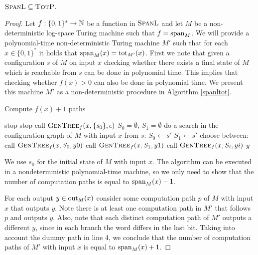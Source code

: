 \begin{theo}
	$\spanl \subseteq \totp$.
\end{theo}
\begin{proof}
	Let $f:\{0,1\}^*\to\N$ be a function in $\spanl$ and let $M$ be a non-deterministic log-space Turing machine such that $f = \sp_M$. We will provide a polynomial-time non-deterministic Turing machine $M'$ such that for each $x\in\{0,1\}^*$ it holds that $\sp_M(x) = \tot_{M'}(x)$. First we note that given a configuration $s$ of $M$ on input $x$ checking whether there exists a final state of $M$ which is reachable from $s$ can be done in polynomial time. This implies that checking whether $f(x) > 0$ can also be done in polynomial time. We present this machine $M'$ as a non-deterministic procedure in Algorithm \ref{spanltot}.
	
	\begin{algorithm}	
		\caption{Compute $f(x)+1$ paths} \label{spanltot}
		\begin{algorithmic}[]
			\Begin
			 stop
			\Else {}
			\State stop
			\State call $\textsc{GenTree}_{f}(x,\{s_0\},\epsilon)$
			\EndIf
			\EndBegin
			\State $S_0 = \emptyset$, $S_1 = \emptyset$
			\State do a search in the configuration graph of $M$ with input $x$ from $s$:
			 $S_0 \gets s'$
			\EndIf
			 $S_1 \gets s'$
			\EndIf
			\EndFor
			 choose between:
			\State call $\textsc{GenTree}_{f}(x,S_0,y0)$
			\State call $\textsc{GenTree}_{f}(x,S_1,y1)$
			\State call $\textsc{GenTree}_{f}(x,S_i,yi)$
			\Return $y$
			\EndIf
			\EndProcedure
		\end{algorithmic}
	\end{algorithm}
	
	We use $s_0$ for the initial state of $M$ with input $x$. The algorithm can be executed in a nondeterministic polynomial-time machine, so we only need to show that the number of computation paths is equal to $\sp_M(x)-1$.
	
	For each output $y \in \out_M(x)$ consider some computation path $p$ of $M$ with input $x$ that outputs $y$. Note there is at least one computation path in $M'$ that follows $p$ and outputs $y$. Also, note that each distinct computation path of $M'$ outputs a different $y$, since in each branch the word differs in the last bit. Taking into account the dummy path in line 4, we conclude that the number of computation paths of $M'$ with input $x$ is equal to $\sp_M(x)+1$. 
\end{proof}



